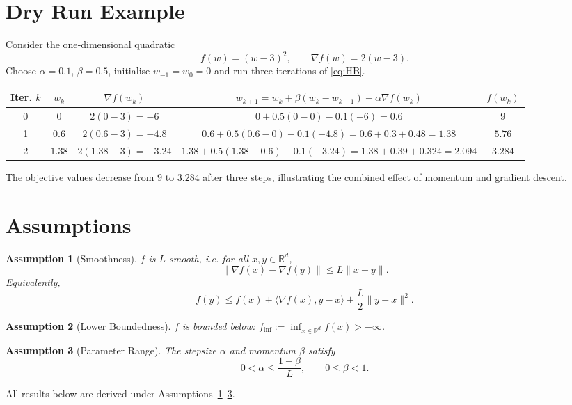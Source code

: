 \documentclass[11pt]{article}
\newtheorem{assumption}{Assumption}
\newcommand{\R}{\mathbb{R}}
\begin{document}
\section*{Dry Run Example}
Consider the one‑dimensional quadratic
\[
f(w)=(w-3)^{2},
\qquad \nabla f(w)=2(w-3).
\]
Choose $\alpha=0.1$, $\beta=0.5$, initialise $w_{-1}=w_{0}=0$ and run three
iterations of \eqref{eq:HB}.

\begin{center}
\begin{tabular}{c|c|c|c|c}
\textbf{Iter.} $k$ & $w_{k}$ & $\nabla f(w_{k})$ & $w_{k+1}=w_{k}+\beta(w_{k}-w_{k-1})-\alpha\nabla f(w_{k})$ & $f(w_{k})$\\\hline
0 & $0$ & $2(0-3)=-6$ & $0+0.5(0-0)-0.1(-6)=0.6$ & $9$\\
1 & $0.6$ & $2(0.6-3)=-4.8$ & $0.6+0.5(0.6-0)-0.1(-4.8)=0.6+0.3+0.48=1.38$ & $5.76$\\
2 & $1.38$ & $2(1.38-3)=-3.24$ & $1.38+0.5(1.38-0.6)-0.1(-3.24)=1.38+0.39+0.324=2.094$ & $3.284$\\
\end{tabular}
\end{center}
The objective values decrease from $9$ to $3.284$ after three steps,
illustrating the combined effect of momentum and gradient descent.

\section*{Assumptions}
\begin{assumption}[Smoothness]\label{ass:smooth}
$f$ is $L$‑smooth, i.e. for all $x,y\in\R^{d}$,
\[
\|\nabla f(x)-\nabla f(y)\|\le L\|x-y\|.
\]
Equivalently,
\[
f(y)\le f(x)+\langle\nabla f(x),y-x\rangle+\frac{L}{2}\|y-x\|^{2}.
\tag{A1}
\]
\end{assumption}
\begin{assumption}[Lower Boundedness]\label{ass:lb}
$f$ is bounded below: $\displaystyle f_{\inf}:=\inf_{x\in\R^{d}}f(x)>-\infty$.
\end{assumption}
\begin{assumption}[Parameter Range]\label{ass:param}
The stepsize $\alpha$ and momentum $\beta$ satisfy
\[
0<\alpha\le\frac{1-\beta}{L},\qquad 0\le\beta<1.
\tag{A2}
\]
\end{assumption}
All results below are derived under Assumptions~\ref{ass:smooth}–\ref{ass:param}.
\end{document}
